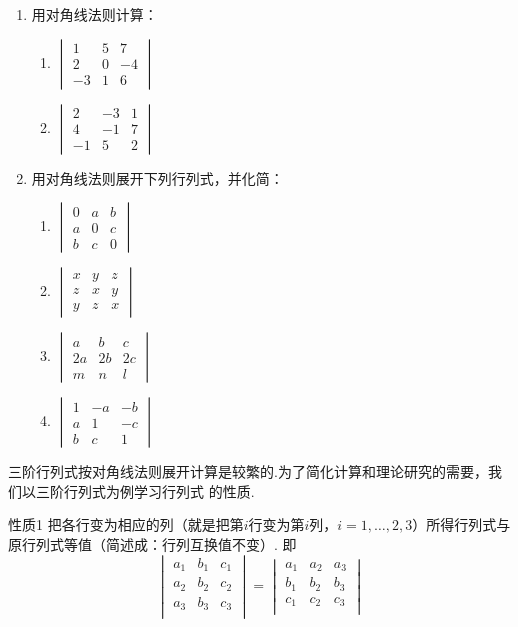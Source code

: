 \begin{enumerate}
  \item 用对角线法则计算：
\begin{multicols}{2}
\begin{enumerate}[(1)]
  \item $\begin{vmatrix}
    1&5&7\\2&0&-4\\-3&1&6
  \end{vmatrix}$
  \item $\begin{vmatrix}
    2&-3&1\\4&-1&7 \\-1&5&2
  \end{vmatrix}$
\end{enumerate}
\end{multicols}
  \item 用对角线法则展开下列行列式，并化简：
\begin{multicols}{2}
\begin{enumerate}[(1)]
  \item $\begin{vmatrix}
    0&a&b\\a&0&c\\b&c&0
  \end{vmatrix}$
  \item $\begin{vmatrix}
    x&y&z\\ z&x&y\\y&z&x
  \end{vmatrix}$
  \item $\begin{vmatrix}
    a&b&c\\2a&2b&2c\\m&n&l
  \end{vmatrix}$
  \item $\begin{vmatrix}
    1&-a&-b\\a&1&-c\\b&c&1
  \end{vmatrix}$
\end{enumerate}
\end{multicols}
\end{enumerate}

三阶行列式按对角线法则展开计算是较繁的.为了简化计算和理论研究的需要，我们以三阶行列式为例学习行列式
的性质.

\begin{thm}
  {性质1} 把各行变为相应的列（就是把第$i$行变为第$i$列，$i=1,\ldots,2,3$）所得行列式与原行列式等值（简述成：行列互换值不变）. 即
\[\begin{vmatrix}
  a_1&b_1&c_1\\
  a_2&b_2&c_2\\
  a_3&b_3&c_3\\
\end{vmatrix}=\begin{vmatrix}
  a_1&a_2&a_3\\
  b_1&b_2&b_3\\
  c_1&c_2&c_3\\
\end{vmatrix}\]
\end{thm}

